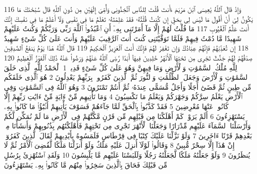 {\tiny\colorbox{cl_aya}{116}} وَإِذْ قَالَ ٱللَّهُ يَٰعِيسَى ٱبْنَ مَرْيَمَ ءَأَنتَ قُلْتَ لِلنَّاسِ ٱتَّخِذُونِى وَأُمِّىَ إِلَٰهَيْنِ مِن دُونِ ٱللَّهِ قَالَ سُبْحَٰنَكَ مَا يَكُونُ لِىٓ أَنْ أَقُولَ مَا لَيْسَ لِى بِحَقٍّ إِن كُنتُ قُلْتُهُۥ فَقَدْ عَلِمْتَهُۥ تَعْلَمُ مَا فِى نَفْسِى وَلَآ أَعْلَمُ مَا فِى نَفْسِكَ إِنَّكَ أَنتَ عَلَّٰمُ ٱلْغُيُوبِ
{\tiny\colorbox{cl_aya}{117}} مَا قُلْتُ لَهُمْ إِلَّا مَآ أَمَرْتَنِى بِهِۦٓ أَنِ ٱعْبُدُوا۟ ٱللَّهَ رَبِّى وَرَبَّكُمْ وَكُنتُ عَلَيْهِمْ شَهِيدًا مَّا دُمْتُ فِيهِمْ فَلَمَّا تَوَفَّيْتَنِى كُنتَ أَنتَ ٱلرَّقِيبَ عَلَيْهِمْ وَأَنتَ عَلَىٰ كُلِّ شَىْءٍ شَهِيدٌ
{\tiny\colorbox{cl_aya}{118}} إِن تُعَذِّبْهُمْ فَإِنَّهُمْ عِبَادُكَ وَإِن تَغْفِرْ لَهُمْ فَإِنَّكَ أَنتَ ٱلْعَزِيزُ ٱلْحَكِيمُ
{\tiny\colorbox{cl_aya}{119}} قَالَ ٱللَّهُ هَٰذَا يَوْمُ يَنفَعُ ٱلصَّٰدِقِينَ صِدْقُهُمْ لَهُمْ جَنَّٰتٌ تَجْرِى مِن تَحْتِهَا ٱلْأَنْهَٰرُ خَٰلِدِينَ فِيهَآ أَبَدًا رَّضِىَ ٱللَّهُ عَنْهُمْ وَرَضُوا۟ عَنْهُ ذَٰلِكَ ٱلْفَوْزُ ٱلْعَظِيمُ
{\tiny\colorbox{cl_aya}{120}} لِلَّهِ مُلْكُ ٱلسَّمَٰوَٰتِ وَٱلْأَرْضِ وَمَا فِيهِنَّ وَهُوَ عَلَىٰ كُلِّ شَىْءٍ قَدِيرٌۢ
{\tiny\colorbox{cl_aya}{1}} ٱلْحَمْدُ لِلَّهِ ٱلَّذِى خَلَقَ ٱلسَّمَٰوَٰتِ وَٱلْأَرْضَ وَجَعَلَ ٱلظُّلُمَٰتِ وَٱلنُّورَ ثُمَّ ٱلَّذِينَ كَفَرُوا۟ بِرَبِّهِمْ يَعْدِلُونَ
{\tiny\colorbox{cl_aya}{2}} هُوَ ٱلَّذِى خَلَقَكُم مِّن طِينٍ ثُمَّ قَضَىٰٓ أَجَلًا وَأَجَلٌ مُّسَمًّى عِندَهُۥ ثُمَّ أَنتُمْ تَمْتَرُونَ
{\tiny\colorbox{cl_aya}{3}} وَهُوَ ٱللَّهُ فِى ٱلسَّمَٰوَٰتِ وَفِى ٱلْأَرْضِ يَعْلَمُ سِرَّكُمْ وَجَهْرَكُمْ وَيَعْلَمُ مَا تَكْسِبُونَ
{\tiny\colorbox{cl_aya}{4}} وَمَا تَأْتِيهِم مِّنْ ءَايَةٍ مِّنْ ءَايَٰتِ رَبِّهِمْ إِلَّا كَانُوا۟ عَنْهَا مُعْرِضِينَ
{\tiny\colorbox{cl_aya}{5}} فَقَدْ كَذَّبُوا۟ بِٱلْحَقِّ لَمَّا جَآءَهُمْ فَسَوْفَ يَأْتِيهِمْ أَنۢبَٰٓؤُا۟ مَا كَانُوا۟ بِهِۦ يَسْتَهْزِءُونَ
{\tiny\colorbox{cl_aya}{6}} أَلَمْ يَرَوْا۟ كَمْ أَهْلَكْنَا مِن قَبْلِهِم مِّن قَرْنٍ مَّكَّنَّٰهُمْ فِى ٱلْأَرْضِ مَا لَمْ نُمَكِّن لَّكُمْ وَأَرْسَلْنَا ٱلسَّمَآءَ عَلَيْهِم مِّدْرَارًا وَجَعَلْنَا ٱلْأَنْهَٰرَ تَجْرِى مِن تَحْتِهِمْ فَأَهْلَكْنَٰهُم بِذُنُوبِهِمْ وَأَنشَأْنَا مِنۢ بَعْدِهِمْ قَرْنًا ءَاخَرِينَ
{\tiny\colorbox{cl_aya}{7}} وَلَوْ نَزَّلْنَا عَلَيْكَ كِتَٰبًا فِى قِرْطَاسٍ فَلَمَسُوهُ بِأَيْدِيهِمْ لَقَالَ ٱلَّذِينَ كَفَرُوٓا۟ إِنْ هَٰذَآ إِلَّا سِحْرٌ مُّبِينٌ
{\tiny\colorbox{cl_aya}{8}} وَقَالُوا۟ لَوْلَآ أُنزِلَ عَلَيْهِ مَلَكٌ وَلَوْ أَنزَلْنَا مَلَكًا لَّقُضِىَ ٱلْأَمْرُ ثُمَّ لَا يُنظَرُونَ
{\tiny\colorbox{cl_aya}{9}} وَلَوْ جَعَلْنَٰهُ مَلَكًا لَّجَعَلْنَٰهُ رَجُلًا وَلَلَبَسْنَا عَلَيْهِم مَّا يَلْبِسُونَ
{\tiny\colorbox{cl_aya}{10}} وَلَقَدِ ٱسْتُهْزِئَ بِرُسُلٍ مِّن قَبْلِكَ فَحَاقَ بِٱلَّذِينَ سَخِرُوا۟ مِنْهُم مَّا كَانُوا۟ بِهِۦ يَسْتَهْزِءُونَ
